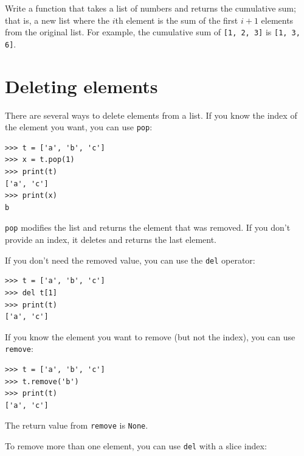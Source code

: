 \documentclass[10pt]{book}
\begin{document}

\begin{ex}
\label{cumulative}

Write a function that takes a list of numbers and returns the
cumulative sum; that is, a new list where the $i$th element
is the sum of the first $i+1$ elements from the original list.
For example, the cumulative sum of {\tt [1, 2, 3]} is
{\tt [1, 3, 6]}. 
\end{ex}


\section{Deleting elements}


There are several ways to delete elements from a list.  If you
know the index of the element you want, you can use
{\tt pop}:


\beforeverb
\begin{verbatim}
>>> t = ['a', 'b', 'c']
>>> x = t.pop(1)
>>> print(t)
['a', 'c']
>>> print(x)
b
\end{verbatim}
\afterverb
%
{\tt pop} modifies the list and returns the element that was removed.
If you don't provide an index, it deletes and returns the
last element.

If you don't need the removed value, you can use the {\tt del}
operator:


\beforeverb
\begin{verbatim}
>>> t = ['a', 'b', 'c']
>>> del t[1]
>>> print(t)
['a', 'c']
\end{verbatim}
\afterverb
%

If you know the element you want to remove (but not the index), you
can use {\tt remove}:


\beforeverb
\begin{verbatim}
>>> t = ['a', 'b', 'c']
>>> t.remove('b')
>>> print(t)
['a', 'c']
\end{verbatim}
\afterverb
%
The return value from {\tt remove} is {\tt None}.


To remove more than one element, you can use {\tt del} with
a slice index:
\end{document}
